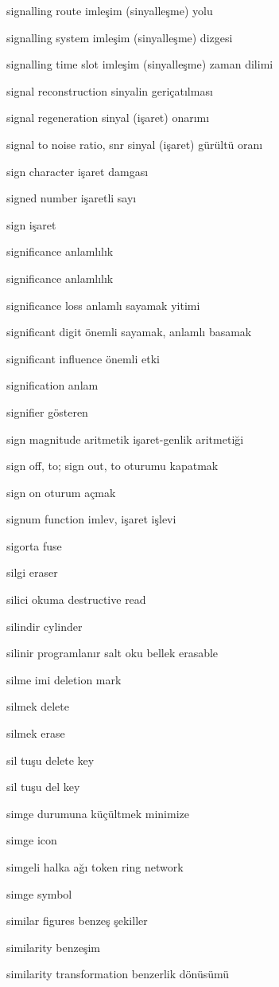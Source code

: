 \documentclass[12pt,fleqn]{article}\usepackage{../../common}
\begin{document}
signalling route imleşim (sinyalleşme) yolu

signalling system imleşim (sinyalleşme) dizgesi

signalling time slot imleşim (sinyalleşme) zaman dilimi

signal reconstruction sinyalin geriçatılması

signal regeneration sinyal (işaret) onarımı

signal to noise ratio, snr sinyal (işaret) gürültü oranı

sign character işaret damgası

signed number işaretli sayı

sign işaret

significance anlamlılık

significance anlamlılık

significance loss anlamlı sayamak yitimi

significant digit önemli sayamak, anlamlı basamak

significant influence önemli etki

signification anlam

signifier gösteren

sign magnitude aritmetik işaret-genlik aritmetiği

sign off, to; sign out, to oturumu kapatmak

sign on oturum açmak

signum function imlev, işaret işlevi

sigorta fuse

silgi eraser

silici okuma destructive read

silindir cylinder

silinir programlanır salt oku bellek erasable

silme imi deletion mark

silmek delete

silmek erase

sil tuşu delete key

sil tuşu del key

simge durumuna küçültmek minimize

simge icon

simgeli halka ağı token ring network

simge symbol

similar figures benzeş şekiller

similarity benzeşim

similarity transformation benzerlik dönüsümü
\end{document}
